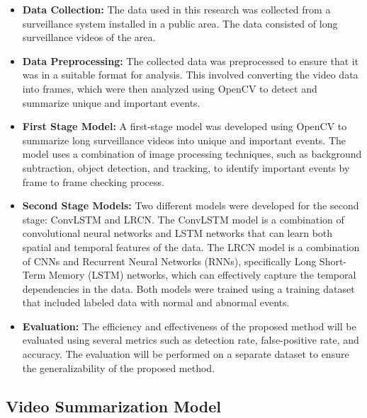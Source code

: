 \documentclass[title page]{article}
\begin{document}
\begin{itemize}
    \item \textbf{Data Collection:} The data used in this research was collected from a surveillance system installed in a public area. The data consisted of long surveillance videos of the area.
    \item \textbf{Data Preprocessing:} The collected data was preprocessed to ensure that it was in a suitable format for analysis. This involved converting the video data into frames, which were then analyzed using OpenCV to detect and summarize unique and important events.
    \item \textbf{First Stage Model:} A first-stage model was developed using OpenCV to summarize long surveillance videos into unique and important events. The model uses a combination of image processing techniques, such as background subtraction, object detection, and tracking, to identify important events by frame to frame checking process.
    \item \textbf{Second Stage Models:} Two different models were developed for the second stage: ConvLSTM and LRCN. The ConvLSTM model is a combination of convolutional neural networks and LSTM networks that can learn both spatial and temporal features of the data. The LRCN model is a combination of CNNs and Recurrent Neural Networks (RNNs), specifically Long Short-Term Memory (LSTM) networks, which can effectively capture the temporal dependencies in the data. Both models were trained using a training dataset that included labeled data with normal and abnormal events.
    \item \textbf{Evaluation:} The efficiency and effectiveness of the proposed method will be evaluated using several metrics such as detection rate, false-positive rate, and accuracy. The evaluation will be performed on a separate dataset to ensure the generalizability of the proposed method.   
\end{itemize}

\subsection{Video Summarization Model}
\end{document}

